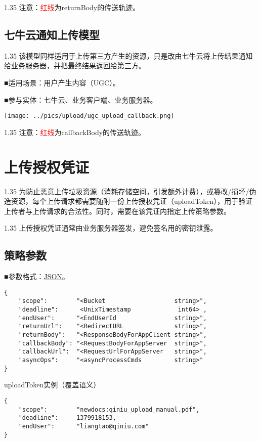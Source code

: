 \documentclass[11pt, oneside]{book}
\newcommand{\qpara}[1]{
\vspace{0.2em}
\begin{spacing}{1.35}
\noindent
#1\par
\end{spacing}
\vspace{0.2em}
}
\newcommand{\qblock}[1]{
\vspace{0.1em}
\noindent
#1\par
\vspace{0.1em}
}
\begin{document}
\qpara{注意：\textcolor{red}{红线}为returnBody的传送轨迹。}

\clearpage

\section{七牛云通知上传模型}

\qpara{该模型同样适用于上传第三方产生的资源，只是改由七牛云将上传结果通知给业务服务器，并把最终结果返回给第三方。}
\qblock{■\thinspace 适用场景：用户产生内容（UGC）。}
\qblock{■\thinspace 参与实体：七牛云、业务客户端、业务服务器。}

\begin{center}
\texttt{[image: ../pics/upload/ugc\_upload\_callback.png]}
\end{center}

\qpara{注意：\textcolor{red}{红线}为callbackBody的传送轨迹。}

\chapter{上传授权凭证}

\qpara{为防止恶意上传垃圾资源（消耗存储空间，引发额外计费），或篡改/损坏/伪造资源，每个上传请求都需要随附一份上传授权凭证（uploadToken），用于验证上传者与上传请求的合法性。同时，需要在该凭证内指定上传策略参数。}
\qpara{上传授权凭证通常由业务服务器签发，避免签名用的密钥泄露。}

\section{策略参数}

\qblock{■\thinspace 参数格式：\href{http://zh.wikipedia.org/wiki/JSON}{JSON}。}
\begin{lstlisting}
{
    "scope":        "<Bucket                   string>",
    "deadline":      <UnixTimestamp             int64> ,
    "endUser":      "<EndUserId                string>",
    "returnUrl":    "<RedirectURL              string>",
    "returnBody":   "<ResponseBodyForAppClient string>",
    "callbackBody": "<RequestBodyForAppServer  string>",
    "callbackUrl":  "<RequestUrlForAppServer   string>",
    "asyncOps":     "<asyncProcessCmds         string>"
}
\end{lstlisting}

\begin{sample}
  \caption{uploadToken实例（覆盖语义）}
\begin{lstlisting}
{
    "scope":        "newdocs:qiniu_upload_manual.pdf",
    "deadline":     1379918153,
    "endUser":      "liangtao@qiniu.com"
}
\end{lstlisting}

  \label{uploadToken-overwrite}
\end{sample}
\end{document}
